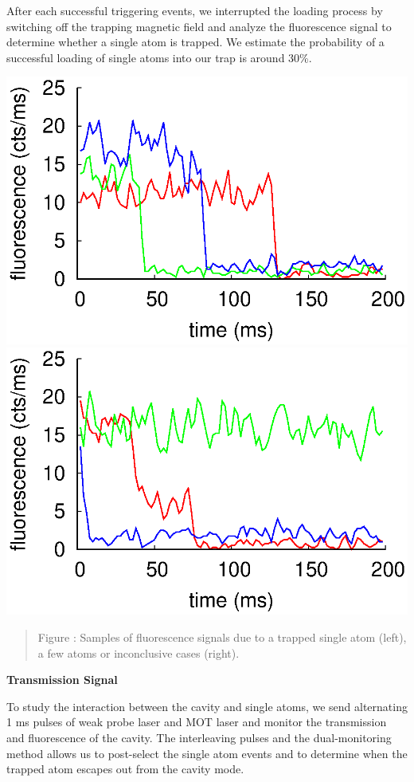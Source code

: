\documentclass[portrait,a0,final]{a0poster} %
\makeatletter
\newenvironment{figurehere}
  {\def\@captype{figure}}
  {}
\newcommand{\figcaption}[1]{
  \vspace{0.5cm}
  \begin{center}
  \begin{quote}
    {\large {\sc Figure} \arabic{figure}: #1}
  \end{quote}
  \end{center}
  \stepcounter{figure}
}
\newenvironment{poster}{
  \begin{center}
  \begin{minipage}[c]{0.98\textwidth}
}{
  \end{minipage}
  \end{center}
}
\makeatother
\begin{document}
\begin{poster}
\begin{multicols}{2}
\begin{figurehere}
\end{figurehere}

\columnbreak

After each successful triggering events, we interrupted the loading process by switching off the trapping magnetic field and analyze the fluorescence signal to determine whether a single atom is trapped. We estimate the probability of a successful loading of single atoms into our trap is around 30\%. 

\begin{figurehere}
  \begin{center}
    \includegraphics[width=0.48\columnwidth]{Plots/SA.eps}
   \hspace*{0cm}
    \includegraphics[width=0.48\columnwidth]{Plots/NSA.eps}
  \end{center}

\vspace{-1cm}

\figcaption{Samples of fluorescence signals due to a trapped single atom (left), a few atoms or inconclusive cases (right).}
\end{figurehere}



\begin{center}
  {\bf \Large \textsf {Transmission Signal}}
\end{center}

To study the interaction between the cavity and single atoms, we send alternating 1 ms pulses of weak probe laser and MOT laser and monitor the transmission and fluorescence of the cavity. The interleaving pulses and the dual-monitoring method allows us to post-select the single atom events and to determine when the trapped atom escapes out from the cavity mode. 


\end{multicols}
\end{poster}
\end{document}
